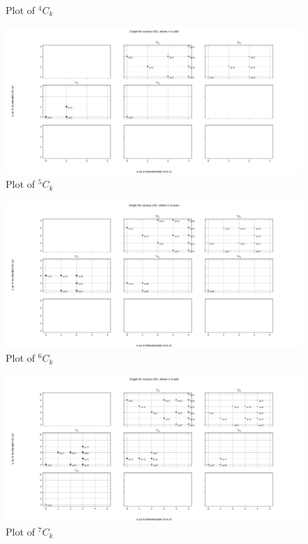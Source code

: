 \documentclass[12pt, twoside]{article}
\newcommand*{\Combination}[2]{{}^{#1}C_{#2}}%
\begin{document}
\begin{appendices}
\begin{figure}[ph!]
	\caption{Plot of $\Combination{4}{k}$}
	\label{4Ck}
\end{figure}
\begin{figure}[ph!]	
	\includegraphics[width=\linewidth]{5Ck.png}
	\caption{Plot of $\Combination{5}{k}$}
	\label{5Ck}
\end{figure}
\begin{figure}[ph!]	
	\includegraphics[width=\linewidth]{6Ck.png}
	\caption{Plot of $\Combination{6}{k}$}
	\label{6Ck}
\end{figure}
\begin{figure}[ph!]	
	\includegraphics[width=\linewidth]{7Ck.png}
	\caption{Plot of $\Combination{7}{k}$}

\end{figure}
\end{appendices}
\end{document}
